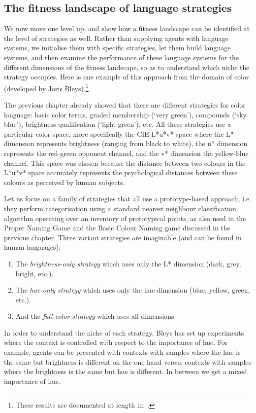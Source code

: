 \subsection{The fitness landscape of language strategies}

We now move one level up, and show how a fitness landscape can be identified at the level of strategies as well. Rather than supplying 
agents with language systems, we initialise them 
with specific strategies, let them build language systems, and then examine the performance 
of these language systems for the different dimensions of the fitness landscape, so as to understand which niche 
the strategy occupies. Here is one example of this approach 
from the domain of color (developed by Joris Bleys).\footnote{These results are documented at length in: \cite{Bleys:2014}.}

The previous chapter already showed that there are 
different strategies for color language: basic color terms, graded membership (`very green'), compounds (`sky blue'), 
brightness qualification (`light green'), etc. All these strategies use a particular color space, more specifically 
the CIE L*u*v* space where the L* dimension represents brightness (ranging from black to white), the u* 
dimension represents the red-green opponent channel, 
and the v* dimension the yellow-blue channel. This space was chosen 
because the distance between two colours in the L*u*v* space accurately represents 
the psychological distances between these colours as perceived by human subjects. 

Let us focus on a family of strategies that all use a prototype-based approach, i.e. they perform categorisation using 
a standard nearest neighbour classification algorithm operating over an inventory of prototypical points, 
as also used in the Proper Naming Game and the Basic Colour Naming game discussed in the previous chapter. 
Three variant strategies are imaginable (and can be found in human languages): \enlargethispage{2\baselineskip}
\begin{enumerate}
\item The {\itshape brightness-only strategy} which uses only the L* dimension (dark, grey, bright, etc.).
\item The {\itshape hue-only strategy} which uses only the hue dimension (blue, yellow, green, etc.). 
\item And the {\itshape full-color strategy} which uses all dimensions. 
\end{enumerate}
In order to understand the niche of each strategy, Bleys has set up experiments where the context is controlled 
with respect to the importance of hue. 
For example, agents can be presented with contexts with samples where the hue is the same but brightness is different on the one 
hand versus contexts with samples where the brightness is the same but hue is different. In between we get a mixed 
importance of hue. 

